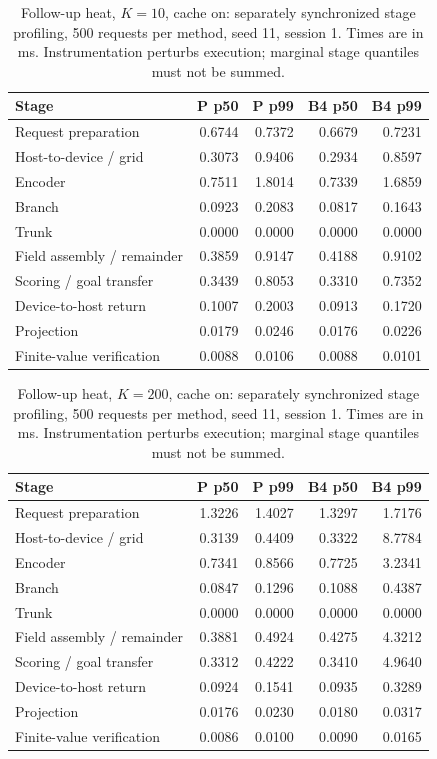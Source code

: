 \begin{table}[ht]
\centering\small
\caption{Follow-up heat, $K=10$, cache on: separately synchronized stage profiling, 500 requests per method, seed 11, session 1. Times are in ms. Instrumentation perturbs execution; marginal stage quantiles must not be summed.}\label{tab:e2_profile_heat_10_on}
\begin{tabular}{@{}lrrrr@{}}\toprule
Stage & P p50 & P p99 & B4 p50 & B4 p99\\\midrule
Request preparation & 0.6744 & 0.7372 & 0.6679 & 0.7231\\
Host-to-device / grid & 0.3073 & 0.9406 & 0.2934 & 0.8597\\
Encoder & 0.7511 & 1.8014 & 0.7339 & 1.6859\\
Branch & 0.0923 & 0.2083 & 0.0817 & 0.1643\\
Trunk & 0.0000 & 0.0000 & 0.0000 & 0.0000\\
Field assembly / remainder & 0.3859 & 0.9147 & 0.4188 & 0.9102\\
Scoring / goal transfer & 0.3439 & 0.8053 & 0.3310 & 0.7352\\
Device-to-host return & 0.1007 & 0.2003 & 0.0913 & 0.1720\\
Projection & 0.0179 & 0.0246 & 0.0176 & 0.0226\\
Finite-value verification & 0.0088 & 0.0106 & 0.0088 & 0.0101\\
\bottomrule\end{tabular}
\end{table}

\begin{table}[ht]
\centering\small
\caption{Follow-up heat, $K=200$, cache on: separately synchronized stage profiling, 500 requests per method, seed 11, session 1. Times are in ms. Instrumentation perturbs execution; marginal stage quantiles must not be summed.}\label{tab:e2_profile_heat_200_on}
\begin{tabular}{@{}lrrrr@{}}\toprule
Stage & P p50 & P p99 & B4 p50 & B4 p99\\\midrule
Request preparation & 1.3226 & 1.4027 & 1.3297 & 1.7176\\
Host-to-device / grid & 0.3139 & 0.4409 & 0.3322 & 8.7784\\
Encoder & 0.7341 & 0.8566 & 0.7725 & 3.2341\\
Branch & 0.0847 & 0.1296 & 0.1088 & 0.4387\\
Trunk & 0.0000 & 0.0000 & 0.0000 & 0.0000\\
Field assembly / remainder & 0.3881 & 0.4924 & 0.4275 & 4.3212\\
Scoring / goal transfer & 0.3312 & 0.4222 & 0.3410 & 4.9640\\
Device-to-host return & 0.0924 & 0.1541 & 0.0935 & 0.3289\\
Projection & 0.0176 & 0.0230 & 0.0180 & 0.0317\\
Finite-value verification & 0.0086 & 0.0100 & 0.0090 & 0.0165\\
\bottomrule\end{tabular}
\end{table}

